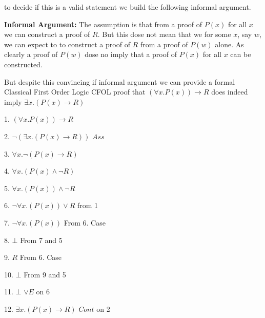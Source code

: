 to decide if this is a valid statement we build  the following informal argument.


{\bf Informal Argument:} The assumption is that  from a proof of $P(x)$  for all $x$ we can construct a proof of  $R$.  But this dose not mean that we for some $x$, say $w$,  we can expect to to construct a proof of $R$ from a proof of $P(w)$ alone. As clearly a proof of  $P(w)$ dose no imply that a proof of $P(x)$  for all $x$ can be constructed.




But  despite this convincing if informal argument we can provide a formal Classical First Order Logic   CFOL proof that $(\forall x. P(x))  \rightarrow R$ does indeed imply $\exists x.  (P(x)\rightarrow R)$ 

1. $(\forall x. P(x))  \rightarrow R$ 

2. \hspace{2ex} $\neg (\exists x.  (P(x)\rightarrow R))$ \hspace{\fill} $Ass$

3. \hspace{2ex} $\forall x.  \neg (P(x)\rightarrow R)$

4. \hspace{2ex} $\forall x.  (P(x)\wedge  \neg R)$

5. \hspace{2ex} $\forall x.  (P(x)) \wedge  \neg R$

6. \hspace{2ex} $\neg \forall x.  (P(x)) \vee  R$  \hspace{\fill} from 1

7. \hspace{4ex}    $\neg \forall x.  (P(x))$  \hspace{\fill} From 6. Case

8.  \hspace{4ex} $\bot$  \hspace{\fill} From 7 and 5

9. \hspace{4ex}    $R$  \hspace{\fill} From 6. Case

10.  \hspace{3ex} $\bot$  \hspace{\fill} From 9 and 5

11. \hspace{1ex} $\bot$ \hspace{\fill} $\vee E$ on 6

12. $\exists x.  (P(x)\rightarrow R)$ \hspace{\fill} $Cont$ on 2

